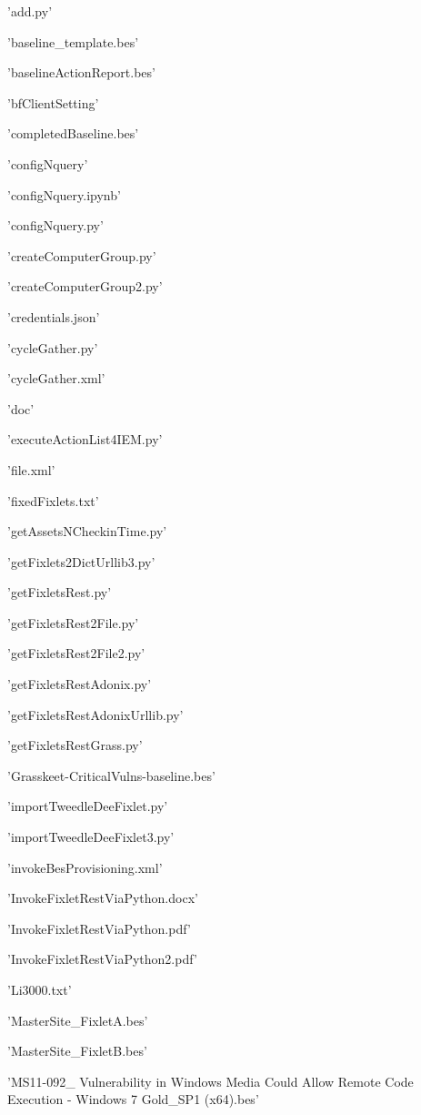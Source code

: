 \documentclass[11pt]{article}
\begin{document}
    \begin{enumerate*}
\item 'add.py'
\item 'baseline\_template.bes'
\item 'baselineActionReport.bes'
\item 'bfClientSetting'
\item 'completedBaseline.bes'
\item 'configNquery'
\item 'configNquery.ipynb'
\item 'configNquery.py'
\item 'createComputerGroup.py'
\item 'createComputerGroup2.py'
\item 'credentials.json'
\item 'cycleGather.py'
\item 'cycleGather.xml'
\item 'doc'
\item 'executeActionList4IEM.py'
\item 'file.xml'
\item 'fixedFixlets.txt'
\item 'getAssetsNCheckinTime.py'
\item 'getFixlets2DictUrllib3.py'
\item 'getFixletsRest.py'
\item 'getFixletsRest2File.py'
\item 'getFixletsRest2File2.py'
\item 'getFixletsRestAdonix.py'
\item 'getFixletsRestAdonixUrllib.py'
\item 'getFixletsRestGrass.py'
\item 'Grasskeet-CriticalVulns-baseline.bes'
\item 'importTweedleDeeFixlet.py'
\item 'importTweedleDeeFixlet3.py'
\item 'invokeBesProvisioning.xml'
\item 'InvokeFixletRestViaPython.docx'
\item 'InvokeFixletRestViaPython.pdf'
\item 'InvokeFixletRestViaPython2.pdf'
\item 'Li3000.txt'
\item 'MasterSite\_FixletA.bes'
\item 'MasterSite\_FixletB.bes'
\item 'MS11-092\_ Vulnerability in Windows Media Could Allow Remote Code Execution - Windows 7 Gold\_SP1 (x64).bes'

\end{enumerate*}
\end{document}

